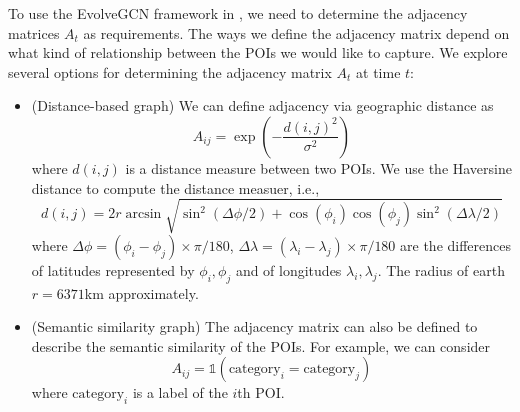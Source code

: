 \documentclass{article}
\begin{document}
\noindent
To use the EvolveGCN framework in \cite{pareja2020evolvegcn},
we need to determine the adjacency matrices $A_t$ as requirements.
The ways we define the adjacency matrix depend on what kind of relationship between the POIs we would like to capture.
We explore several options
for determining the adjacency matrix $A_t$ at time $t$:
\begin{itemize}
    \item(Distance-based graph) We can define adjacency via geographic distance as 
    \[
        A_{ij} = \exp\left(-\frac{d(i,j)^2}{\sigma^2}\right)
    \]
    where $d(i,j)$ is a distance measure between two POIs.
    We use the Haversine distance to compute the distance measuer, i.e.,
    \[
    d(i,j) = 2r\arcsin\sqrt{\sin^2(\Delta \phi/2) + \cos(\phi_i)\cos(\phi_j)\sin^2(\Delta \lambda/2)}
    \]
    where $\Delta \phi = (\phi_i - \phi_j)\times \pi/180$,
    $\Delta \lambda = (\lambda_i - \lambda_j)\times \pi/180$
    are the differences of latitudes represented by $\phi_i, \phi_j$
    and of longitudes $\lambda_i, \lambda_j$.
    The radius of earth $r=6371$km approximately.

    \item(Semantic similarity graph)
    The adjacency matrix can also be defined to describe the semantic similarity of the POIs.
    For example, we can consider
    \[
    A_{ij} = \mathds{1}(\text{category}_i=\text{category}_j)
    \]
    where $\text{category}_i$
    is a label of the $i$th POI.

\end{itemize}
\end{document}
